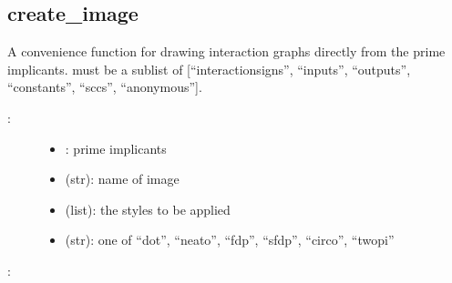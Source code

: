 \documentclass[letterpaper,10pt,english]{sphinxmanual}
\begin{document}
\subsection{create\_image}
\label{\detokenize{InteractionGraphs:id7}}\label{\detokenize{InteractionGraphs:create-image}}

\begin{fulllineitems}
\label{\detokenize{InteractionGraphs:PyBoolNet.InteractionGraphs.create_image}}
A convenience function for drawing interaction graphs directly from the prime implicants.
 must be a sublist of {[}“interactionsigns”, “inputs”, “outputs”, “constants”, “sccs”, “anonymous”{]}.
\begin{description}
\item[{:}] \leavevmode\begin{itemize}
\item {} 
: prime implicants

\item {} 
 (str): name of image

\item {} 
 (list): the styles to be applied

\item {} 
 (str): one of “dot”, “neato”, “fdp”, “sfdp”, “circo”, “twopi”

\end{itemize}

\end{description}

:

\begin{sphinxVerbatim}[commandchars=\\\{\}]
  \PYG{p}{[} \PYG{p}{]}
\end{sphinxVerbatim}

\end{fulllineitems}
\end{document}
